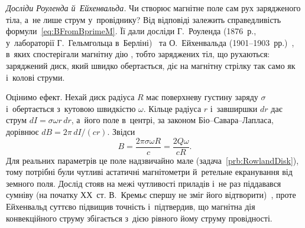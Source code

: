 \begin{Historical}\label{hist:RowlandEichenwald}
	\emph{Досліди Роуленда й~Ейхенвальда.} Чи створює магнітне поле сам рух зарядженого
	тіла, а~не лише струм у~провіднику? Від відповіді залежить справедливість
	формули~\eqref{eq:BFromBprimeM}. Її дали досліди Г.~Роуленда (1876~р., у~лабораторії
	Г.~Гельмгольца в~Берліні)~\cite{Helmholtz1876Rowland} та О.~Ейхенвальда (1901--1903~рр.)~\cite{Eichenwald1903}, в~яких спостерігали
	магнітну дію , тобто заряджених тіл, що рухаються:
	заряджений диск, який швидко обертається, діє на магнітну стрілку так само як і~колові
	струми.

	Оцінимо ефект. Нехай диск радіуса $R$ має поверхневу густину заряду $\sigma$
	і~обертається з~кутовою швидкістю $\omega$. Кільце радіуса $r$ і~завширшки $dr$ дає
	струм $dI = \sigma\omega r\, dr$, а~його поле в~центрі, за законом Біо--Савара--Лапласа,
	дорівнює $dB = 2\pi\, dI/(cr)$. Звідси
	\begin{equation*}
		B = \frac{2\pi\sigma\omega R}{c} = \frac{2Q\omega}{cR}.
	\end{equation*}
	Для реальних параметрів це поле надзвичайно мале (задача~\ref{prb:RowlandDisk}), тому
	потрібні були чутливі астатичні магнітометри й~ретельне екранування від земного поля.
	Дослід стояв на межі чутливості приладів і~не раз піддавався сумніву (на початку
	ХХ~ст. В.~Кремьє спершу не зміг його відтворити)~\cite{PenderCremieu1903}, проте Ейхенвальд суттєво підвищив
	точність і~підтвердив, що магнітна дія конвекційного струму збігається з~дією рівного
	йому струму провідності.

\end{Historical}

